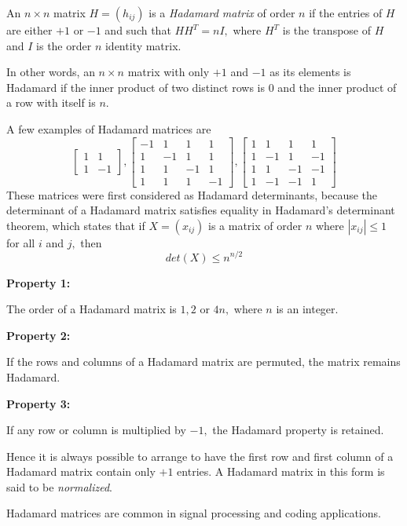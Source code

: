 \documentclass[12pt]{article}
\begin{document}


An $n\times n$ matrix $H = (h_{ij})$ is a \emph{Hadamard matrix} of order $n$ if the entries of $H$ are either 
$+1$ or $-1$ and such that $HH^T = nI,$ where $H^T$ is the transpose of $H$ and $I$ is the order $n$
identity matrix.

In other words, an $n\times n$ matrix with only $+1$ and $-1$ as its elements is Hadamard if the inner product of two distinct rows is 
$0$ and the inner product of a row with itself is $n$.

A few examples of Hadamard matrices are 
$$\begin{bmatrix} 1 & 1 \\ 1 & -1\end{bmatrix} ,   \begin{bmatrix} -1 & 1 & 1 & 1 \\ 1 & -1 & 1 & 1 \\ 1 & 1 & -1 & 1 \\ 1 & 1 & 1 & -1\end{bmatrix},   \begin{bmatrix} 1 & 1 & 1 & 1 \\ 1 & -1 & 1 & -1 \\ 1 & 1 & -1 & -1 \\ 1 & -1 & -1 & 1\end{bmatrix}$$
These matrices were first considered as Hadamard determinants, because the determinant of a Hadamard matrix satisfies equality in Hadamard's determinant theorem, which states that if $X = (x_{ij})$ is a matrix of order $n$ where $|x_{ij}| \leq 1$ for all $i$ and $j,$ then
$$det(X) \leq n^{n/2}$$

\textbf{Property 1:}

The order of a Hadamard matrix is $1, 2$ or $4n,$ where $n$ is an integer.

\textbf{Property 2:}

If the rows and columns of a Hadamard matrix are permuted, the matrix remains Hadamard.

\textbf{Property 3:}

If any row or column is multiplied  by $-1,$ the Hadamard property is retained.

Hence it is always possible to arrange to have the first row and first column of  a Hadamard matrix contain
only $+1$ entries. A Hadamard matrix in this form is said to be \emph{normalized}.

Hadamard matrices are common in signal processing and coding applications.
\end{document}
